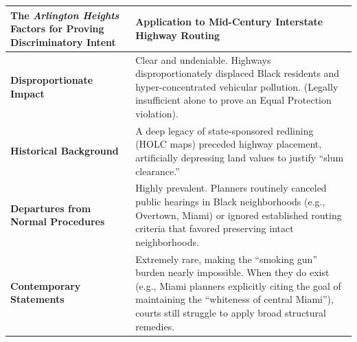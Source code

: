 \documentclass[
]{article}
\newcounter{none} %
\begin{document}
{\def\LTcaptype{none} %
\begin{longtable}[]{@{}
  >{\raggedright\arraybackslash}p{}
  >{\raggedright\arraybackslash}p{}@{}}
\toprule\noalign{}
\begin{minipage}[b]{\linewidth}\raggedright
The \emph{Arlington Heights} Factors for Proving Discriminatory Intent
\end{minipage} & \begin{minipage}[b]{\linewidth}\raggedright
Application to Mid-Century Interstate Highway Routing
\end{minipage} \\
\midrule\noalign{}
\endhead
\bottomrule\noalign{}
\endlastfoot
\textbf{Disproportionate Impact} & Clear and undeniable. Highways
disproportionately displaced Black residents and hyper-concentrated
vehicular pollution. (Legally insufficient alone to prove an Equal
Protection violation). \\
\textbf{Historical Background} & A deep legacy of state-sponsored
redlining (HOLC maps) preceded highway placement, artificially
depressing land values to justify ``slum clearance.'' \\
\textbf{Departures from Normal Procedures} & Highly prevalent. Planners
routinely canceled public hearings in Black neighborhoods (e.g.,
Overtown, Miami) or ignored established routing criteria that favored
preserving intact neighborhoods. \\
\textbf{Contemporary Statements} & Extremely rare, making the ``smoking
gun'' burden nearly impossible. When they do exist (e.g., Miami planners
explicitly citing the goal of maintaining the ``whiteness of central
Miami''), courts still struggle to apply broad structural remedies. \\
\end{longtable}
}
\end{document}
